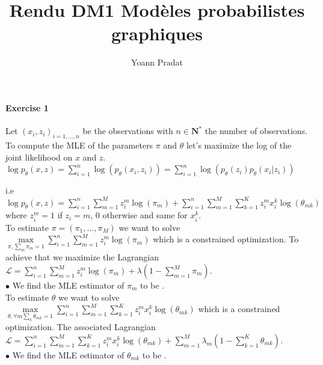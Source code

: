 \documentclass[a4paper, 11pt]{article}
\begin{document}
\title{Rendu DM1 Modèles probabilistes graphiques} 
\author{Yoann Pradat}
\maketitle

\paragraph{Exercise 1}

Let $(x_i, z_i)_{i=1,\dots,n}$ be the observations with $n \in \mathbf{N}^*$ the number of observations. To compute the
MLE of the parameters $\pi$ and $\theta$ let's maximize the log of the joint likelihood on $x$ and $z$.\\

$\log p_{\theta}(x, z) = \sum_{i=1}^n \log(p_{\theta}(x_i,z_i))=\sum_{i=1}^n \log(p_{\theta}(z_i)p_{\theta}(x_i|z_i))$ \\

\smallbreak

i.e $\log p_{\theta}(x, z) =\sum_{i=1}^n \sum_{m=1}^M z_i^m \log(\pi_m) + \sum_{i=1}^n \sum_{m=1}^M \sum_{k=1}^K z_i^m
x_i^k \log(\theta_{mk})$\\ 

where $z_i^m = 1$ if $z_i = m$, 0 otherwise and same for $x_i^k$. \\

To estimate $\pi=(\pi_1, \dots, \pi_M)$ we want to solve $\max\limits_{\pi, \sum_m \pi_m = 1} \sum_{i=1}^n \sum_{m=1}^M
z_i^m \log(\pi_m)$ which is a constrained optimization. To achieve that we maximize the Lagrangian $\mathcal{L} = 
\sum_{i=1}^n \sum_{m=1}^M z_i^m \log(\pi_m) + \lambda (1-\sum_{m=1}^M \pi_m)$. \\

$\bullet$ We find the MLE estimator of $\pi_m$ to be . \\

To estimate $\theta$ we want to solve $\max\limits_{\theta, \forall m \sum_k \theta_{mk} = 1} \sum_{i=1}^n \sum_{m=1}^M 
\sum_{k=1}^K z_i^m x_i^k \log(\theta_{mk}) $ which is a constrained optimization. The associated Lagrangian $\mathcal{L} 
= \sum_{i=1}^n \sum_{m=1}^M \sum_{k=1}^K z_i^m x_i^k \log(\theta_{mk}) + \sum_{m=1}^M \lambda_m  (1-\sum_{k=1}^K
\theta_{mk})$. \\

$\bullet$ We find the MLE estimator of $\theta_{mk}$ to be . \\
\end{document}
